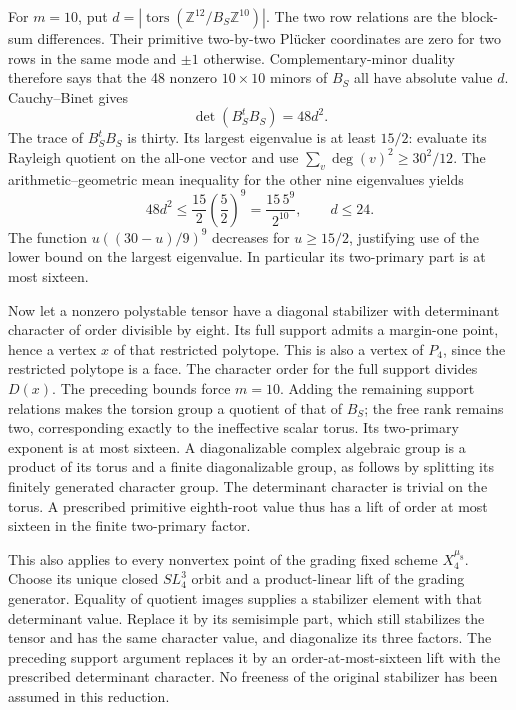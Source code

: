 For $m=10$, put $d=|\operatorname{tors}(
\mathbb Z^{12}/B_S\mathbb Z^{10})|$. The two row relations are the
block-sum differences. Their primitive two-by-two Pl\"ucker coordinates
are zero for two rows in the same mode and $\pm1$ otherwise.
Complementary-minor duality therefore says that the 48 nonzero
$10\times10$ minors of $B_S$ all have absolute value $d$.
Cauchy--Binet gives
\[
                   \det(B_S^tB_S)=48d^2.                     \tag{K-007a}
\]
The trace of $B_S^tB_S$ is thirty. Its largest eigenvalue is at least
$15/2$: evaluate its Rayleigh quotient on the all-one vector and use
$\sum_v\deg(v)^2\ge30^2/12$. The arithmetic--geometric mean inequality
for the other nine eigenvalues yields
\[
 48d^2\le \frac{15}{2}\left(\frac52\right)^9
       =\frac{15\,5^9}{2^{10}},\qquad d\le24.                 \tag{K-007b}
\]
The function $u((30-u)/9)^9$ decreases for $u\ge15/2$, justifying
use of the lower bound on the largest eigenvalue. In particular its
two-primary part is at most sixteen.

Now let a nonzero polystable tensor have a diagonal stabilizer with
determinant character of order divisible by eight. Its full support
admits a margin-one point, hence a vertex $x$ of that restricted
polytope. This is also a vertex of $P_4$, since the restricted polytope
is a face. The character order for the full support divides $D(x)$.
The preceding bounds force $m=10$. Adding the remaining support
relations makes the torsion group a quotient of that of $B_S$;
the free rank remains two, corresponding exactly to the ineffective
scalar torus. Its two-primary exponent is at most sixteen.
A diagonalizable complex algebraic group is a product of its torus
and a finite diagonalizable group, as follows by splitting its finitely
generated character group. The determinant character is trivial on
the torus. A prescribed primitive eighth-root value thus has a lift
of order at most sixteen in the finite two-primary factor.

This also applies to every nonvertex point of the grading fixed
scheme $X_4^{\mu_8}$. Choose its unique closed $SL_4^3$ orbit and a
product-linear lift of the grading generator. Equality of quotient
images supplies a stabilizer element with that determinant value.
Replace it by its semisimple part, which still stabilizes the tensor
and has the same character value, and diagonalize its three factors.
The preceding support argument replaces it by an order-at-most-sixteen
lift with the prescribed determinant character. No freeness of the
original stabilizer has been assumed in this reduction.

